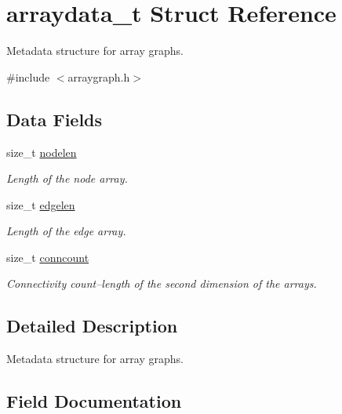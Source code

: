 \hypertarget{structarraydata__t}{}\section{arraydata\+\_\+t Struct Reference}
\label{structarraydata__t}


Metadata structure for array graphs.  




{\ttfamily \#include $<$arraygraph.\+h$>$}

\subsection*{Data Fields}
\begin{DoxyCompactItemize}
\item 
size\+\_\+t \hyperlink{structarraydata__t_ab7b4b6740dd5353c323233dea2e2eaee}{nodelen}
\begin{DoxyCompactList}\small\item\em Length of the node array. \end{DoxyCompactList}\item 
size\+\_\+t \hyperlink{structarraydata__t_a1bcdcd2b541e02eb0d20be0563a1f447}{edgelen}
\begin{DoxyCompactList}\small\item\em Length of the edge array. \end{DoxyCompactList}\item 
size\+\_\+t \hyperlink{structarraydata__t_a84f30a007d02c7b40025284d4fa70e20}{conncount}
\begin{DoxyCompactList}\small\item\em Connectivity count--length of the second dimension of the arrays. \end{DoxyCompactList}\end{DoxyCompactItemize}


\subsection{Detailed Description}
Metadata structure for array graphs. 

\subsection{Field Documentation}
\mbox{\label{structarraydata__t_a84f30a007d02c7b40025284d4fa70e20}} 
